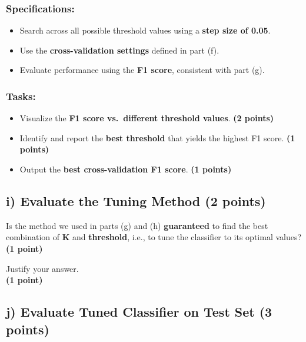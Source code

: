 \documentclass[
  letterpaper,
  DIV=11,
  numbers=noendperiod]{scrreprt}
\providecommand{\tightlist}{%
  \setlength{\itemsep}{0pt}\setlength{\parskip}{0pt}}\usepackage{longtable,booktabs,array}
\begin{document}
\subsubsection{Specifications:}\label{specifications}

\begin{itemize}
\tightlist
\item
  Search across all possible threshold values using a \textbf{step size
  of 0.05}.
\item
  Use the \textbf{cross-validation settings} defined in part (f).
\item
  Evaluate performance using the \textbf{F1 score}, consistent with part
  (g).
\end{itemize}

\subsubsection{Tasks:}\label{tasks}

\begin{itemize}
\tightlist
\item
  Visualize the \textbf{F1 score vs.~different threshold values}.
  \textbf{(2 points)}
\item
  Identify and report the \textbf{best threshold} that yields the
  highest F1 score. \textbf{(1 points)}
\item
  Output the \textbf{best cross-validation F1 score}. \textbf{(1
  points)}
\end{itemize}

\subsection{\texorpdfstring{i) Evaluate the Tuning Method \textbf{(2
points)}}{i) Evaluate the Tuning Method (2 points)}}\label{i-evaluate-the-tuning-method-2-points}

Is the method we used in parts (g) and (h) \textbf{guaranteed} to find
the best combination of \textbf{K} and \textbf{threshold}, i.e., to tune
the classifier to its optimal values?\\
\textbf{(1 point)}

Justify your answer.\\
\textbf{(1 point)}

\subsection{\texorpdfstring{j) Evaluate Tuned Classifier on Test Set
\textbf{(3
points)}}{j) Evaluate Tuned Classifier on Test Set (3 points)}}\label{j-evaluate-tuned-classifier-on-test-set-3-points}
\end{document}
